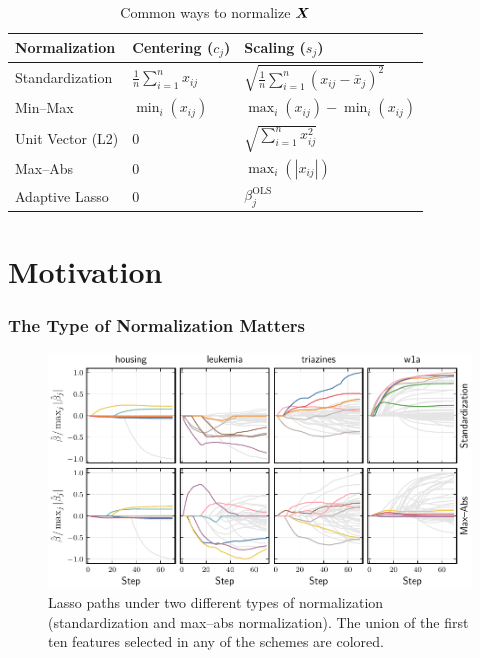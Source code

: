 \documentclass[10pt]{beamer}
\begin{document}
\begin{frame}[c]
  \begin{table}[hbt]
    \centering
    \caption{Common ways to normalize \(\boldsymbol{X}\)}
    \label{tab:normalization-types}
    \begin{tabular}{lll}
      \toprule
      Normalization    & Centering (\(c_{j}\))              & Scaling (\(s_j\))                                         \\
      \midrule
      Standardization  & \(\frac{1}{n}\sum_{i=1}^n x_{ij}\) & \(\sqrt{\frac{1}{n}\sum_{i=1}^n (x_{ij} - \bar{x}_j)^2}\) \\
      \addlinespace
      Min--Max         & \(\min_i(x_{ij})\)                 & \(\max_i(x_{ij}) - \min_i(x_{ij})\)                       \\
      \addlinespace
      Unit Vector (L2) & 0                                  & \(\sqrt{\sum_{i=1}^n x_{ij}^2}\)                          \\
      \addlinespace
      Max--Abs         & 0                                  & \(\max_i(|x_{ij}|)\)                                      \\
      \addlinespace
      Adaptive Lasso   & 0                                  & \(\beta_j^\text{OLS}\)                                    \\
      \bottomrule
    \end{tabular}
  \end{table}
\end{frame}

\section{Motivation}

\begin{frame}[c]
  \frametitle{The Type of Normalization Matters}

  \begin{figure}[htpb]
    \centering
    \includegraphics[width=\textwidth]{figures/realdata_paths.pdf}
    \caption{%
      Lasso paths under two different types of normalization (standardization and max--abs normalization). The union of the first ten features selected in any of the schemes are colored.
    }
  \end{figure}

\end{frame}
\end{document}

